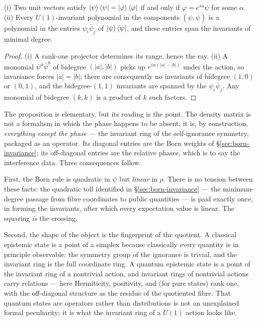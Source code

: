 \begin{proposition}
\label{prop:invariant-ring}
(i) Two unit vectors satisfy
$\ket{\psi}\bra{\psi} = \ket{\varphi}\bra{\varphi}$ if and only if
$\varphi = e^{i\alpha}\psi$ for some $\alpha$. (ii) Every
$U(1)$-invariant polynomial in the components $(\psi, \bar\psi)$ is a
polynomial in the entries $\psi_i\bar\psi_j$ of
$\ket{\psi}\bra{\psi}$, and these entries span the invariants of
minimal degree.
\end{proposition}

\begin{proof}
(i) A rank-one projector determines its range, hence the ray. (ii) A
monomial $\psi^{a}\bar\psi^{b}$ of bidegree $(|a|,|b|)$ picks up
$e^{i\alpha(|a|-|b|)}$ under the action, so invariance forces
$|a| = |b|$; there are consequently no invariants of bidegree $(1,0)$
or $(0,1)$, and the bidegree-$(1,1)$ invariants are spanned by the
$\psi_i\bar\psi_j$. Any monomial of bidegree $(k,k)$ is a product of
$k$ such factors.
\end{proof}

The proposition is elementary, but its reading is the point. The
density matrix is not a formalism in which the phase happens to be
absent; it is, by construction, \emph{everything except the phase} ---
the invariant ring of the self-ignorance symmetry, packaged as an
operator. Its diagonal entries are the Born weights of
\S\ref{sec:born-invariance}; its off-diagonal entries are the relative phases,
which is to say the interference data. Three consequences follow.

First, the Born rule is quadratic in $\psi$ but \emph{linear} in
$\rho$. There is no tension between these facts: the quadratic toll
identified in \S\ref{sec:born-invariance} --- the minimum-degree passage from
fibre coordinates to public quantities --- is paid exactly once, in
forming the invariants, after which every expectation value is linear.
The squaring \emph{is} the crossing.

Second, the shape of the object is the fingerprint of the quotient. A
classical epistemic state is a point of a simplex because classically
every quantity is in principle observable: the symmetry group of the
ignorance is trivial, and the invariant ring is the full coordinate
ring. A quantum epistemic state is a point of the invariant ring of a
nontrivial action, and invariant rings of nontrivial actions carry
relations --- here Hermiticity, positivity, and (for pure states)
rank one, with the off-diagonal structure as the residue of the
quotiented fibre. That quantum states are operators rather than
distributions is not an unexplained formal peculiarity; it is what the
invariant ring of a $U(1)$ action looks like.

